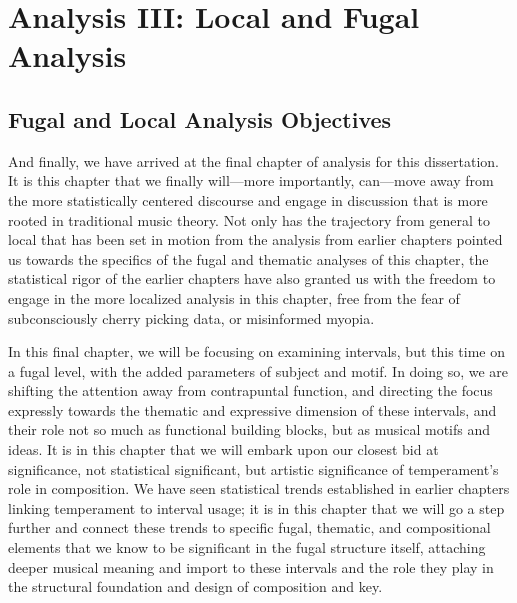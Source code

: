     
    
    

    \hypertarget{Analysis III: Local and Fugal Analysis}{\chapter{Analysis III: Local and Fugal Analysis}\label{Analysis III: Local and Fugal Analysis}}


    \section{Fugal and Local Analysis
Objectives}\label{fugal-and-local-analysis-objectives}

    And finally, we have arrived at the final chapter of analysis for this
dissertation. It is this chapter that we finally will---more
importantly, can---move away from the more statistically centered
discourse and engage in discussion that is more rooted in traditional
music theory. Not only has the trajectory from general to local that has
been set in motion from the analysis from earlier chapters pointed us
towards the specifics of the fugal and thematic analyses of this
chapter, the statistical rigor of the earlier chapters have also granted
us with the freedom to engage in the more localized analysis in this
chapter, free from the fear of subconsciously cherry picking data, or
misinformed myopia.

In this final chapter, we will be focusing on examining intervals, but
this time on a fugal level, with the added parameters of subject and
motif. In doing so, we are shifting the attention away from contrapuntal
function, and directing the focus expressly towards the thematic and
expressive dimension of these intervals, and their role not so much as
functional building blocks, but as musical motifs and ideas. It is in
this chapter that we will embark upon our closest bid at significance,
not statistical significant, but artistic significance of temperament's
role in composition. We have seen statistical trends established in
earlier chapters linking temperament to interval usage; it is in this
chapter that we will go a step further and connect these trends to
specific fugal, thematic, and compositional elements that we know to be
significant in the fugal structure itself, attaching deeper musical
meaning and import to these intervals and the role they play in the
structural foundation and design of composition and key.

